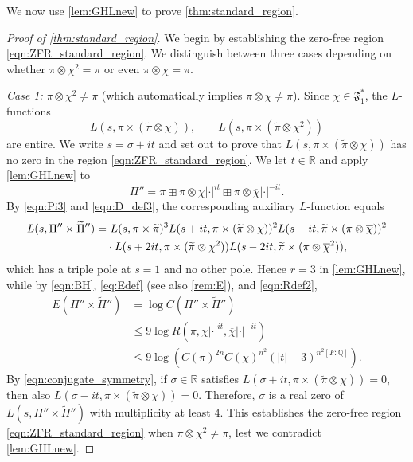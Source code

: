 \documentclass[12pt]{amsart}
\theoremstyle{definition}
\theoremstyle{remark}
\numberwithin{equation}{section}
\theoremstyle{plain}
\renewcommand{\tilde}{\widetilde}
\renewcommand{\bar}{\overline}
\newcommand{\Q}{\mathbb{Q}}
\newcommand{\R}{\mathbb{R}}
\begin{document}
We now use \cref{lem:GHLnew} to prove \cref{thm:standard_region}.

\begin{proof}[Proof of \cref{thm:standard_region}]
We begin by establishing the zero-free region \eqref{eqn:ZFR_standard_region}.  We distinguish between three cases depending on whether $\pi\otimes\chi^2=\pi$ or even $\pi\otimes\chi=\pi$.

\emph{Case 1:} $\pi\otimes\chi^2\neq\pi$ (which automatically implies $\pi\otimes\chi\neq\pi$).  Since $\chi\in\mathfrak{F}_1^*$, the $L$-functions
\[
L(s,\pi\times(\tilde{\pi}\otimes\chi)),\qquad L(s,\pi\times(\tilde{\pi}\otimes\chi^2))
\]
are entire. We write $s=\sigma+it$ and set out to prove that $L(s,\pi\times(\tilde\pi\otimes\chi))$ has no zero in the region \eqref{eqn:ZFR_standard_region}. We let $t\in\R$ and apply \cref{lem:GHLnew} to 
\begin{equation}
\label{specialPi}
\Pi''=\pi\boxplus\pi\otimes\chi|\cdot|^{it}\boxplus\pi\otimes\bar{\chi}|\cdot|^{-it}.
\end{equation}
By \eqref{eqn:Pi3} and \eqref{eqn:D_def3}, the corresponding auxiliary $L$-function equals
\begin{align}
\label{specialD}
L(s,\Pi''\times\tilde{\Pi}'')=
&~L(s,\pi\times\tilde\pi)^3 L(s+it,\pi\times(\tilde\pi\otimes\chi))^2 L(s-it,\tilde\pi\times(\pi\otimes\bar{\chi}))^2\\
\notag
&\cdot L(s+2it,\pi\times(\tilde\pi\otimes\chi^2)) L(s-2it,\tilde\pi\times(\pi\otimes\bar{\chi}^2)),
\end{align}
which has a triple pole at $s=1$ and no other pole. Hence $r=3$ in \cref{lem:GHLnew}, while by 
\eqref{eqn:BH}, \eqref{eq:Edef} (see also \cref{rem:E}), and \eqref{eqn:Rdef2},
\begin{align*}
E(\Pi''\times\tilde{\Pi}'')
&=\log C(\Pi''\times\tilde{\Pi}'')\\
&\leq 9\log R(\pi,\chi|\cdot|^{it},\bar{\chi}|\cdot|^{-it})\\
&\leq 9\log(C(\pi)^{2n}C(\chi)^{n^2}(|t|+3)^{n^2[F:\Q]}).
\end{align*}
By \eqref{eqn:conjugate_symmetry}, if $\sigma\in\R$ satisfies $L(\sigma+it,\pi\times(\tilde{\pi}\otimes\chi))=0$, then also $L(\sigma-it,\pi\times(\tilde{\pi}\otimes\bar{\chi}))=0$.  Therefore, $\sigma$ is a real zero of $L(s,\Pi''\times\tilde{\Pi}'')$ with multiplicity at least $4$.  This establishes the zero-free region \eqref{eqn:ZFR_standard_region} when $\pi\otimes\chi^2\neq\pi$, lest we contradict \cref{lem:GHLnew}.


\end{proof}
\end{document}

